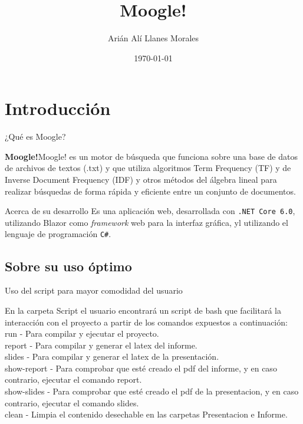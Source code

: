 \documentclass{beamer}
\title[Moogle!]{\LARGE Moogle!}
\author{Arián Alí Llanes Morales}
\institute[Universidad de La Habana]
{
  Matcom
}
\date{\today}
\begin{document}
\begin{frame}
  \maketitle
\end{frame}

\section{Introducción}

\begin{frame}{¿Qué es Moogle?}
  
  \textbf{Moogle!}Moogle! es un motor de búsqueda que funciona sobre una base 
de datos de archivos de textos (.txt) y que utiliza algoritmos Term Frequency (TF) 
y de Inverse Document Frequency (IDF) y otros métodos del álgebra lineal para realizar búsquedas
 de forma rápida y eficiente entre un conjunto de documentos.


\end{frame}

\begin{frame}{Acerca de su desarrollo}
  Es una aplicación web, desarrollada con {\tt .NET Core 6.0}, 
  utilizando Blazor como {\it framework} web para la interfaz gráfica, yl
 utilizando el lenguaje de programación {\tt C\#}. \\
\end{frame}


\subsection*{Sobre su uso óptimo}

\begin{frame}{Uso del script para mayor comodidad del usuario}
    \begin{center}
	En la carpeta Script el usuario encontrará un script de bash que facilitará la interacción con el proyecto
a partir de los comandos expuestos a continuación:
\\run - Para compilar y ejecutar el proyecto.
\\report - Para compilar y generar el latex del informe.
\\slides - Para compilar y generar el latex de la presentación.
\\show-report - Para comprobar que esté creado el pdf del informe, y en caso contrario, ejecutar el comando report.
\\show-slides - Para comprobar que esté creado el pdf de la presentacion, y en caso contrario, ejecutar el comando slides.
\\clean - Limpia el contenido desechable en las carpetas Presentacion e Informe.     
    \end{center}
\end{frame}
\end{document}
